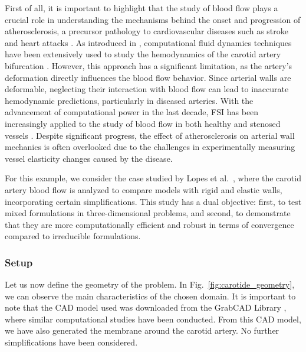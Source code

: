 \documentclass[11pt,english]{article}
\begin{document}
First of all, it is important to highlight that the study of blood flow plays a crucial role in understanding the mechanisms behind the onset and progression of atherosclerosis, a precursor pathology to cardiovascular diseases such as stroke and heart attacks \cite{xu2018atherosclerosis}. 
As introduced in \cite{lopes2019}, 
computational fluid dynamics techniques have been extensively used to study the hemodynamics of the carotid artery bifurcation \cite{gharabi2016,rispoli2015computational,sousa2012blood}. However, this approach has a significant limitation, as the artery's deformation directly influences the blood flow behavior. Since arterial walls are deformable, neglecting their interaction with blood flow can lead to inaccurate hemodynamic predictions, particularly in diseased arteries. With the advancement of computational power in the last decade, FSI has been increasingly applied to the study of blood flow in both healthy and stenosed vessels \cite{lee2012fluid, khader2014haemodynamics}. Despite significant progress, the effect of atherosclerosis on arterial wall mechanics is often overlooked due to the challenges in experimentally measuring vessel elasticity changes caused by the disease.

For this example, we consider the case studied by Lopes et al.~\cite{lopes2019}, where the carotid artery blood flow is analyzed to compare models with rigid and elastic walls, incorporating certain simplifications. This study has a dual objective: first, to test mixed formulations in three-dimensional problems, and second, to demonstrate that they are more computationally efficient and robust in terms of convergence compared to irreducible formulations.


\subsubsection{Setup}

Let us now define the geometry of the problem. In Fig.~\ref{fig:carotide_geometry}, we can observe the main characteristics of the chosen domain. It is important to note that the CAD model used was downloaded from the GrabCAD Library \cite{carotidCAD}, where similar computational studies have been conducted. From this CAD model, we have also generated the membrane around the carotid artery. No further simplifications have been considered.
\end{document}
